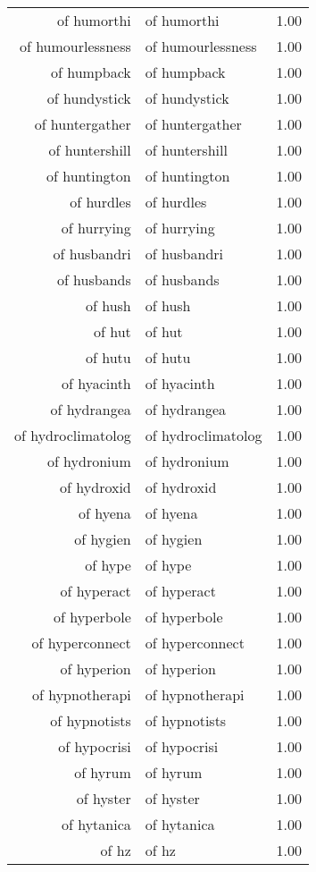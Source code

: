 \begin{table}[ht]
\begin{tabular}{rlr}
  of humorthi & of humorthi & 1.00 \\ 
  of humourlessness & of humourlessness & 1.00 \\ 
  of humpback & of humpback & 1.00 \\ 
  of hundystick & of hundystick & 1.00 \\ 
  of huntergather & of huntergather & 1.00 \\ 
  of huntershill & of huntershill & 1.00 \\ 
  of huntington & of huntington & 1.00 \\ 
  of hurdles & of hurdles & 1.00 \\ 
  of hurrying & of hurrying & 1.00 \\ 
  of husbandri & of husbandri & 1.00 \\ 
  of husbands & of husbands & 1.00 \\ 
  of hush & of hush & 1.00 \\ 
  of hut & of hut & 1.00 \\ 
  of hutu & of hutu & 1.00 \\ 
  of hyacinth & of hyacinth & 1.00 \\ 
  of hydrangea & of hydrangea & 1.00 \\ 
  of hydroclimatolog & of hydroclimatolog & 1.00 \\ 
  of hydronium & of hydronium & 1.00 \\ 
  of hydroxid & of hydroxid & 1.00 \\ 
  of hyena & of hyena & 1.00 \\ 
  of hygien & of hygien & 1.00 \\ 
  of hype & of hype & 1.00 \\ 
  of hyperact & of hyperact & 1.00 \\ 
  of hyperbole & of hyperbole & 1.00 \\ 
  of hyperconnect & of hyperconnect & 1.00 \\ 
  of hyperion & of hyperion & 1.00 \\ 
  of hypnotherapi & of hypnotherapi & 1.00 \\ 
  of hypnotists & of hypnotists & 1.00 \\ 
  of hypocrisi & of hypocrisi & 1.00 \\ 
  of hyrum & of hyrum & 1.00 \\ 
  of hyster & of hyster & 1.00 \\ 
  of hytanica & of hytanica & 1.00 \\ 
  of hz & of hz & 1.00 \\ 

\end{tabular}
\end{table}
